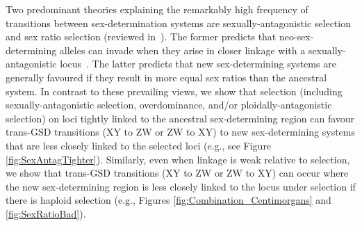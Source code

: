 \documentclass[10pt,letterpaper]{article}
\begin{document}
Two predominant theories explaining the remarkably high frequency of transitions between sex-determination systems are sexually-antagonistic selection and sex ratio selection (reviewed in~\cite{Blaser2012, vanDoorn2014re}).
The former predicts that neo-sex-determining alleles can invade when they arise in closer linkage with a sexually-antagonistic locus~\cite{vanDoorn:2007eu,vanDoorn:2010hu, Muralidhar2018}.
The latter predicts that new sex-determining systems are generally favoured if they result in more equal sex ratios than the ancestral system. 
In contrast to these prevailing views, we show that selection (including sexually-antagonistic selection, overdominance, and/or ploidally-antagonistic selection) on loci tightly linked to the ancestral sex-determining region can favour trans-GSD transitions (XY to ZW or ZW to XY) to new sex-determining systems that are less closely linked to the selected loci (e.g., see Figure \ref{fig:SexAntagTighter}). 
Similarly, even when linkage is weak relative to selection, we show that %
trans-GSD transitions (XY to ZW or ZW to XY) can occur where the new sex-determining region is less closely linked to the locus under selection if there is haploid selection (e.g., Figures \ref{fig:Combination_Centimorgans} and \ref{fig:SexRatioBad}). 
\end{document}

